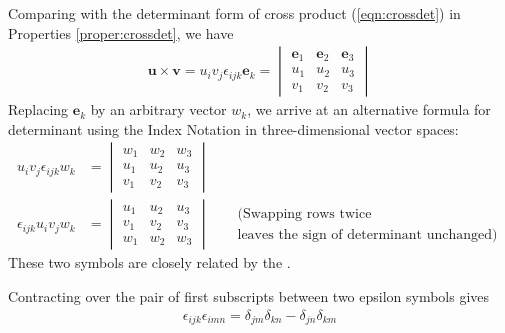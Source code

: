 Comparing with the determinant form of cross product (\ref{eqn:crossdet}) in Properties \ref{proper:crossdet}, we have
\begin{align}
\textbf{u} \times \textbf{v} = u_iv_j \epsilon_{ijk} \textbf{e}_k = 
\begin{vmatrix}
\textbf{e}_1 & \textbf{e}_2 & \textbf{e}_3 \\
u_1 & u_2 & u_3 \\
v_1 & v_2 & v_3
\end{vmatrix}
\label{eqn:crosstens}
\end{align}
Replacing $\textbf{e}_k$ by an arbitrary vector $w_k$, we arrive at an alternative formula for determinant using the Index Notation in three-dimensional vector spaces:
\begin{align}
u_iv_j \epsilon_{ijk} w_k &= 
\begin{vmatrix}
w_1 & w_2 & w_3 \\
u_1 & u_2 & u_3 \\
v_1 & v_2 & v_3
\end{vmatrix}  \nonumber \\
\epsilon_{ijk}  u_iv_jw_k &= 
\begin{vmatrix}
u_1 & u_2 & u_3 \\
v_1 & v_2 & v_3 \\
w_1 & w_2 & w_3
\end{vmatrix} & \begin{aligned}
&\text{(Swapping rows twice} \\ 
&\text{leaves the sign of determinant unchanged)}     
\end{aligned} \label{eqn:determinanteps1} 
\end{align}
These two symbols are closely related by the .
\begin{proper} 
\label{proper:epsdel} Contracting over the pair of first subscripts between two epsilon symbols gives 
\begin{align}
\epsilon_{ijk}\epsilon_{imn} = \delta_{jm}\delta_{kn} - \delta_{jn}\delta_{km} \label{eqn:epsdel}
\end{align}
\end{proper}
